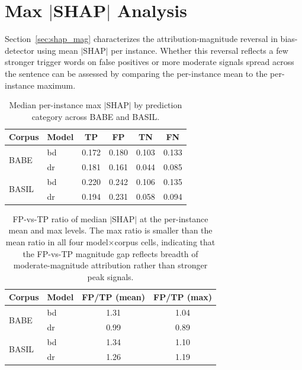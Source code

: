 \documentclass[11pt]{article}
\begin{document}
\section{Max $|$SHAP$|$ Analysis}
\label{app:max_shap}

Section~\ref{sec:shap_mag} characterizes the attribution-magnitude 
reversal in bias-detector using mean $|$SHAP$|$ per instance. Whether 
this reversal reflects a few stronger trigger words on false positives 
or more moderate signals spread across the sentence can be assessed 
by comparing the per-instance mean to the per-instance maximum.

\begin{table}[h]
\centering
\small
\setlength{\tabcolsep}{4pt}
\begin{tabular}{llcccc}
\toprule
Corpus & Model & TP & FP & TN & FN \\
\midrule
\multirow{2}{*}{BABE}  & bd & 0.172 & 0.180 & 0.103 & 0.133 \\
                       & dr & 0.181 & 0.161 & 0.044 & 0.085 \\
\midrule
\multirow{2}{*}{BASIL} & bd & 0.220 & 0.242 & 0.106 & 0.135 \\
                       & dr & 0.194 & 0.231 & 0.058 & 0.094 \\
\bottomrule
\end{tabular}
\caption{Median per-instance max $|$SHAP$|$ by prediction category 
across BABE and BASIL.}
\label{tab:max_shap}
\end{table}

\begin{table}[h]
\centering
\small
\setlength{\tabcolsep}{6pt}
\begin{tabular}{llcc}
\toprule
Corpus & Model & FP/TP (mean) & FP/TP (max) \\
\midrule
\multirow{2}{*}{BABE}  & bd & 1.31 & 1.04 \\
                       & dr & 0.99 & 0.89 \\
\midrule
\multirow{2}{*}{BASIL} & bd & 1.34 & 1.10 \\
                       & dr & 1.26 & 1.19 \\
\bottomrule
\end{tabular}
\caption{FP-vs-TP ratio of median $|$SHAP$|$ at the per-instance 
mean and max levels. The max ratio is smaller than the mean ratio in 
all four model$\times$corpus cells, indicating that the FP-vs-TP 
magnitude gap reflects breadth of moderate-magnitude attribution 
rather than stronger peak signals.}
\label{tab:max_vs_mean_ratios}
\end{table}
\end{document}
